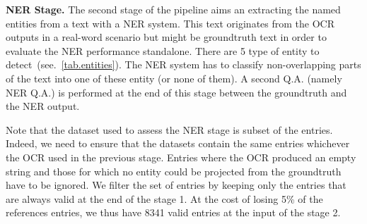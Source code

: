 



\textbf{NER Stage.} The second stage of the pipeline aims an extracting the named entities from a text with a NER
system. This text originates from the OCR outputs in a real-word scenario but might be groundtruth text in order to
evaluate the NER performance standalone. There are 5 type of entity to detect~(see.~\cref{tab.entities}).
The NER system has to classify non-overlapping parts of the text into one of these entity (or none of them). A second
Q.A. (namely NER Q.A.) is performed at the end of this stage between the groundtruth and the NER output.

Note that the dataset used to assess the NER stage is subset of the entries. Indeed, we need to ensure that the datasets
contain the same entries whichever the OCR used in the previous stage. Entries where the OCR produced an empty string
and those for which no entity could be projected from the groundtruth have to be ignored. We filter the set of entries by
keeping only the entries that are always valid at the end of the stage 1. At the cost of losing  5\% of the references
entries, we thus have 8341 valid entries at the input of the stage 2.


